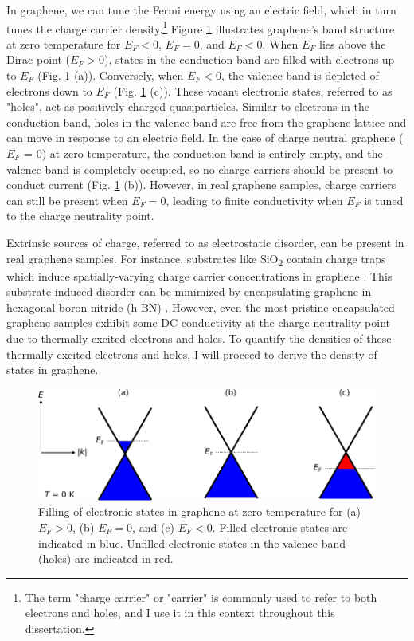 \documentclass[double,12pt,1in]{beavtex}
\begin{document}
In graphene, we can tune the Fermi energy using an electric field, which in turn tunes the charge carrier density.\footnote{The term "charge carrier" or "carrier" is commonly used to refer to both electrons and holes, and I use it in this context throughout this dissertation.} Figure \ref{graphene bands at 0 T} illustrates graphene's band structure at zero temperature for $E_F < 0$, $E_F = 0$, and $E_F < 0$. When $E_F$ lies above the Dirac point ($E_F > 0$), states in the conduction band are filled with electrons up to $E_F$ (Fig. \ref{graphene bands at 0 T} (a)). Conversely, when $E_F < 0$, the valence band is depleted of electrons down to $E_F$ (Fig. \ref{graphene bands at 0 T} (c)). These vacant electronic states, referred to as "holes", act as positively-charged quasiparticles. Similar to electrons in the conduction band, holes in the valence band are free from the graphene lattice and can move in response to an electric field. In the case of charge neutral graphene ($E_F$ = 0) at zero temperature, the conduction band is entirely empty, and the valence band is completely occupied, so no charge carriers should be present to conduct current (Fig. \ref{graphene bands at 0 T} (b)). However, in real graphene samples, charge carriers can still be present when $E_F = 0$, leading to finite conductivity when $E_F$ is tuned to the charge neutrality point.

Extrinsic sources of charge, referred to as electrostatic disorder, can be present in real graphene samples. For instance, substrates like SiO\textsubscript{2} contain charge traps which induce spatially-varying charge carrier concentrations in graphene \cite{martin_observation_2008}. This substrate-induced disorder can be minimized by encapsulating graphene in hexagonal boron nitride (h-BN) \cite{dean_boron_2010}. However, even the most pristine encapsulated graphene samples exhibit some DC conductivity at the charge neutrality point \cite{xin_giant_2023} due to thermally-excited electrons and holes. To quantify the densities of these thermally excited electrons and holes, I will proceed to derive the density of states in graphene.


\begin{figure}
    \includegraphics{graphene theory 0}
    \caption{Filling of electronic states in graphene at zero temperature for (a) $E_F >0$, (b) $E_F = 0$, and (c) $E_F < 0$. Filled electronic states are indicated in blue. Unfilled electronic states in the valence band (holes) are indicated in red.}
    \label{graphene bands at 0 T}
\end{figure}
\end{document}
